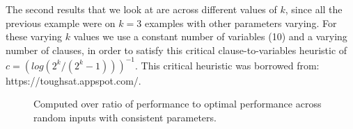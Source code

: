 \documentclass[paper=a4, fontsize=11pt]{scrartcl} %
\numberwithin{equation}{section} %
\numberwithin{figure}{section} %
\numberwithin{table}{section} %
\begin{document}
The second results that we look at are across different values of $k$, since all the previous example were on $k=3$ examples with other parameters varying.  For these varying $k$ values we use a constant number of variables (10) and a varying number of clauses, in order to satisfy this critical clause-to-variables heuristic of $c=(log(2^k/(2^k-1)))^{-1}$.  This critical heuristic was borrowed from: https://toughsat.appspot.com/.\\

\begin{figure}[ht]
\vspace{-0.1in}
\centerline{
}
\vspace{-0.1in}
\caption{Computed over ratio of performance to optimal performance across random inputs with consistent parameters.}
\label{statistics}
\end{figure}
\end{document}
